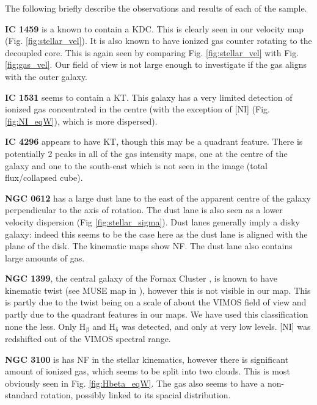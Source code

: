 \documentclass[fleqn,usenatbib,useAMS]{mnras}
\begin{document}
	The following briefly describe the observations and results of each of the sample. %

	\textbf{IC 1459} is a known to contain a KDC. This is clearly seen in our velocity map (Fig. \ref{fig:stellar_vel}). It is also known to have ionized gas counter rotating to the decoupled core. This is again seen by comparing Fig. \ref{fig:stellar_vel} with Fig. \ref{fig:gas_vel}. Our field of view is not large enough to investigate if the gas aligns with the outer galaxy.

	\textbf{IC 1531} seems to contain a KT. This galaxy has a very limited detection of ionized gas concentrated in the centre (with the exception of [NI] (Fig. \ref{fig:NI_eqW}), which is more dispersed).

	\textbf{IC 4296} appears to have KT, though this may be a quadrant feature. There is potentially 2 peaks in all of the gas intensity maps, one at the centre of the galaxy and one to the south-east which is not seen in the image (total flux/collapsed cube).

	\textbf{NGC 0612} has a large dust lane to the east of the apparent centre of the galaxy perpendicular to the axis of rotation. The dust lane is also seen as a lower velocity dispersion (Fig \ref{fig:stellar_sigma}). Dust lanes generally imply a disky galaxy: indeed this seems to be the case here as the dust lane is aligned with the plane of the disk. The kinematic maps show NF. The dust lane also contains large amounts of gas. 

	\textbf{NGC 1399}, the central galaxy of the Fornax Cluster \citep{Jordan2007}, is known to have kinematic twist (see MUSE map in \citet{Zieleniewski2017}), however this is not visible in our map. This is partly due to the twist being on a scale of about the VIMOS field of view and partly due to the quadrant features in our maps. We have used this classification none the less. Only H$_\mathrm{\beta}$ and H$_\mathrm{\delta}$ was detected, and only at very low levels. [NI] was redshifted out of the VIMOS spectral range.

	\textbf{NGC 3100} is has NF in the stellar kinematics, however there is significant amount of ionized gas, which seems to be split into two clouds. This is most obviously seen in Fig. \ref{fig:Hbeta_eqW}. The gas also seems to have a non-standard rotation, possibly linked to its spacial distribution. 
\end{document}
